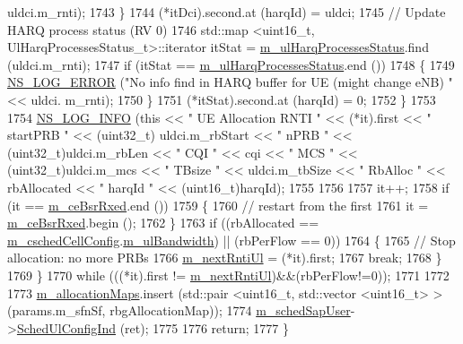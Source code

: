\begin{DoxyCode}
      uldci.m\_rnti);
1743             \}
1744           (*itDci).second.at (harqId) = uldci;
1745           \textcolor{comment}{// Update HARQ process status (RV 0)}
1746           std::map <uint16\_t, UlHarqProcessesStatus\_t>::iterator itStat = 
      \hyperlink{classns3_1_1TtaFfMacScheduler_a2c0bc82abe6c71b7e4d85b4caca2aaa6}{m\_ulHarqProcessesStatus}.find (uldci.m\_rnti);
1747           \textcolor{keywordflow}{if} (itStat == \hyperlink{classns3_1_1TtaFfMacScheduler_a2c0bc82abe6c71b7e4d85b4caca2aaa6}{m\_ulHarqProcessesStatus}.end ())
1748             \{
1749               \hyperlink{group__logging_ga0261a8db1d4ac5f79417d117634fd455}{NS\_LOG\_ERROR} (\textcolor{stringliteral}{"No info find in HARQ buffer for UE (might change eNB) "} << uldci.
      m\_rnti);
1750             \}
1751           (*itStat).second.at (harqId) = 0;
1752         \}
1753 
1754       \hyperlink{group__logging_gafbd73ee2cf9f26b319f49086d8e860fb}{NS\_LOG\_INFO} (\textcolor{keyword}{this} << \textcolor{stringliteral}{" UE Allocation RNTI "} << (*it).first << \textcolor{stringliteral}{" startPRB "} << (uint32\_t)
      uldci.m\_rbStart << \textcolor{stringliteral}{" nPRB "} << (uint32\_t)uldci.m\_rbLen << \textcolor{stringliteral}{" CQI "} << cqi << \textcolor{stringliteral}{" MCS "} << (uint32\_t)uldci.m\_mcs 
      << \textcolor{stringliteral}{" TBsize "} << uldci.m\_tbSize << \textcolor{stringliteral}{" RbAlloc "} << rbAllocated << \textcolor{stringliteral}{" harqId "} << (uint16\_t)harqId);
1755 
1756 
1757       it++;
1758       \textcolor{keywordflow}{if} (it == \hyperlink{classns3_1_1TtaFfMacScheduler_a6b88fda6059c5679b747c2e1856729b1}{m\_ceBsrRxed}.end ())
1759         \{
1760           \textcolor{comment}{// restart from the first}
1761           it = \hyperlink{classns3_1_1TtaFfMacScheduler_a6b88fda6059c5679b747c2e1856729b1}{m\_ceBsrRxed}.begin ();
1762         \}
1763       \textcolor{keywordflow}{if} ((rbAllocated == \hyperlink{classns3_1_1TtaFfMacScheduler_af263a06ea69ff1d096ddb48df0ac7f81}{m\_cschedCellConfig}.\hyperlink{structns3_1_1FfMacCschedSapProvider_1_1CschedCellConfigReqParameters_a5ab5b102878e6e7e7727a14af4a64d2f}{m\_ulBandwidth}) || (rbPerFlow ==
       0))
1764         \{
1765           \textcolor{comment}{// Stop allocation: no more PRBs}
1766           \hyperlink{classns3_1_1TtaFfMacScheduler_a4342a2e63a980d852d3cb6ef1e77197b}{m\_nextRntiUl} = (*it).first;
1767           \textcolor{keywordflow}{break};
1768         \}
1769     \}
1770   \textcolor{keywordflow}{while} (((*it).first != \hyperlink{classns3_1_1TtaFfMacScheduler_a4342a2e63a980d852d3cb6ef1e77197b}{m\_nextRntiUl})&&(rbPerFlow!=0));
1771 
1772 
1773   \hyperlink{classns3_1_1TtaFfMacScheduler_a8931533e6964833d4e1da1e8c6d20313}{m\_allocationMaps}.insert (std::pair <uint16\_t, std::vector <uint16\_t> > (params.m\_sfnSf, 
      rbgAllocationMap));
1774   \hyperlink{classns3_1_1TtaFfMacScheduler_a950cb3e5f468debf1fa002171ff299f1}{m\_schedSapUser}->\hyperlink{classns3_1_1FfMacSchedSapUser_a1b89636256701a84d990db7db8aea874}{SchedUlConfigInd} (ret);
1775 
1776   \textcolor{keywordflow}{return};
1777 \}
\end{DoxyCode}


